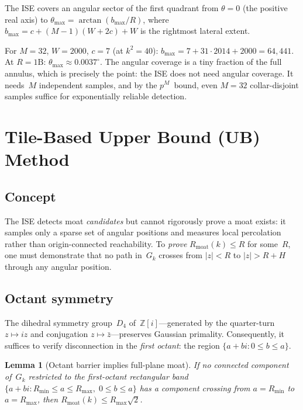 \documentclass[11pt,a4paper]{article}
\newcommand{\Zi}{\mathbb{Z}[i]}
\newcommand{\Gk}{G_k}
\newcommand{\Rmoat}{R_{\mathrm{moat}}}
\theoremstyle{definition}
\theoremstyle{plain}
\newtheorem{lemma}[theorem]{Lemma}
\theoremstyle{remark}
\begin{document}
The ISE covers an angular sector of the first quadrant from $\theta = 0$ (the positive real axis) to $\theta_{\max} = \arctan(b_{\max} / R)$, where $b_{\max} = c + (M-1)(W + 2c) + W$ is the rightmost lateral extent.

For $M = 32$, $W = 2000$, $c = 7$ (at $k^2 = 40$): $b_{\max} = 7 + 31 \cdot 2014 + 2000 = 64{,}441$.  At $R = 1\text{B}$: $\theta_{\max} \approx 0.0037^\circ$.  The angular coverage is a tiny fraction of the full annulus, which is precisely the point: the ISE does not need angular coverage.  It needs~$M$ independent samples, and by the $p^M$~bound, even $M = 32$ collar-disjoint samples suffice for exponentially reliable detection.


\section{Tile-Based Upper Bound (UB) Method}\label{sec:ub}

\subsection{Concept}

The ISE detects moat \emph{candidates} but cannot rigorously prove a moat exists: it samples only a sparse set of angular positions and measures local percolation rather than origin-connected reachability.  To \emph{prove} $\Rmoat(k) \le R$ for some~$R$, one must demonstrate that no path in~$\Gk$ crosses from $|z| < R$ to $|z| > R + H$ through any angular position.

\subsection{Octant symmetry}

The dihedral symmetry group~$D_4$ of~$\Zi$---generated by the quarter-turn $z \mapsto iz$ and conjugation $z \mapsto \bar{z}$---preserves Gaussian primality.  Consequently, it suffices to verify disconnection in the \emph{first octant}: the region $\{a + bi : 0 \le b \le a\}$.

\begin{lemma}[Octant barrier implies full-plane moat]\label{lem:octant}
If no connected component of~$\Gk$ restricted to the first-octant rectangular band $\{a + bi : R_{\min} \le a \le R_{\max},\; 0 \le b \le a\}$ has a component crossing from $a = R_{\min}$ to $a = R_{\max}$, then $\Rmoat(k) \le R_{\max}\sqrt{2}$.
\end{lemma}
\end{document}

